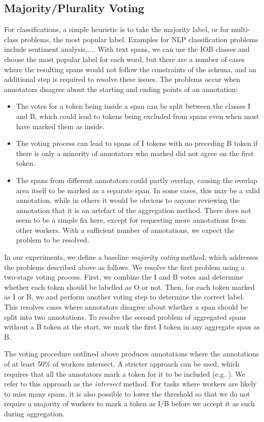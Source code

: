 \subsection{Majority/Plurality Voting}

For classifications, a simple heuristic is to take the majority label, or for multi-class problems, the most popular label. Examples for NLP classification problems include sentiment analysis\cite{sayeed2011crowdsourcing},.... With text spans, we can use the IOB classes and choose the most popular label for each word, but there are a number of cases where the resulting spans would not follow the constraints of the schema, and an additional step is required to resolve these issues. The problems occur when annotators disagree about the starting and ending points of an annotation:
\begin{itemize}
  \item The votes for a token being inside a span can be split between the classes I and B, which could lead to tokens being excluded from spans even when most have marked them as inside. 
  \item The voting process can lead to spans of I tokens with no preceding B token if there is only a minority of annotators who marked did not agree on the first token. 
  \item The spans from different annotators could partly overlap, causing the overlap area itself to be marked as a separate span. In some cases, this may be a valid annotation, while in others it would be obvious to anyone reviewing the annotation that it is an artefact of the aggregation method. There does not seem to be a simple fix here, except for requesting more annotations from other workers. With a sufficient number of annotations, we expect the problem to be resolved.
\end{itemize}
In our experiments, we define a baseline \emph{majority voting} method, which addresses the problems described above as follows. We resolve the first problem using a two-stage voting process. First, we combine the I and B votes and determine whether each token should be labelled as O or not. Then, for each token marked as I or B, we and perform another voting step to determine the correct label. This resolves cases where annotators disagree about whether a span should be split into two annotations. To resolve the second problem of aggregated spans without a B token at the start, we mark the first I token in any aggregate span as B.  

The voting procedure outlined above produces annotations where the annotations of at least 50\% of workers intersect. A stricter approach can be used, which requires that all the annotators mark a token for it to be included (e.g. \cite{farra2015annotating}). We refer to this approach as the \emph{intersect} method. For tasks where workers are likely to miss many spans, it is also possible to lower the threshold so that we do not require a majority of workers to mark a token as I/B before we accept it as such during aggregation.

